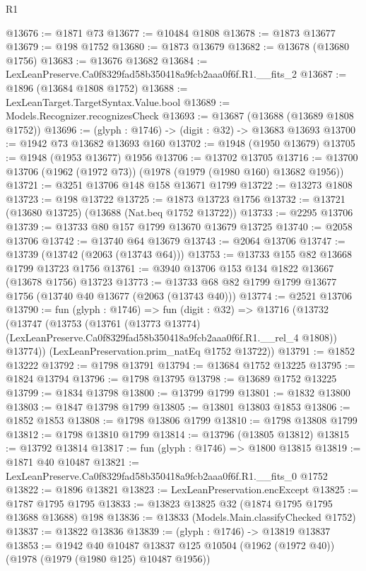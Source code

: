 \begin{lexlean}{R1}
\begin{coremodule}
@13676 := @1871 @73
@13677 := @10484 @1808
@13678 := @1873 @13677
@13679 := @198 @1752
@13680 := @1873 @13679
@13682 := @13678 (@13680 @1756)
@13683 := @13676 @13682
@13684 := LexLeanPreserve.Ca0f8329fad58b350418a9fcb2aaa0f6f.R1.__fits_2
@13687 := @1896 (@13684 @1808 @1752)
@13688 := LexLeanTarget.TargetSyntax.Value.bool
@13689 := Models.Recognizer.recognizesCheck
@13693 := @13687 (@13688 (@13689 @1808 @1752))
@13696 := (glyph : @1746) -> (digit : @32) -> @13683 @13693
@13700 := @1942 @73 @13682 @13693 @160
@13702 := @1948 (@1950 @13679)
@13705 := @1948 (@1953 @13677) @1956
@13706 := @13702 @13705
@13716 := @13700 @13706 (@1962 (@1972 @73)) (@1978 (@1979 (@1980 @160) @13682 @1956))
@13721 := @3251 @13706 @148 @158 @13671 @1799
@13722 := @13273 @1808
@13723 := @198 @13722
@13725 := @1873 @13723 @1756
@13732 := @13721 (@13680 @13725) (@13688 (Nat.beq @1752 @13722))
@13733 := @2295 @13706
@13739 := @13733 @80 @157 @1799 @13670 @13679 @13725
@13740 := @2058 @13706
@13742 := @13740 @64 @13679
@13743 := @2064 @13706
@13747 := @13739 (@13742 (@2063 (@13743 @64)))
@13753 := @13733 @155 @82 @13668 @1799 @13723 @1756
@13761 := @3940 @13706 @153 @134 @1822 @13667 (@13678 @1756) @13723
@13773 := @13733 @68 @82 @1799 @1799 @13677 @1756 (@13740 @40 @13677 (@2063 (@13743 @40)))
@13774 := @2521 @13706
@13790 := fun (glyph : @1746) =>
  fun (digit : @32) =>
  @13716
    (@13732
      (@13747
        (@13753
          (@13761
            (@13773 @13774)
            (LexLeanPreserve.Ca0f8329fad58b350418a9fcb2aaa0f6f.R1.__rel_4 @1808))
          @13774))
      (LexLeanPreservation.prim_natEq @1752 @13722))
@13791 := @1852 @13222
@13792 := @1798 @13791
@13794 := @13684 @1752 @13225
@13795 := @1824 @13794
@13796 := @1798 @13795
@13798 := @13689 @1752 @13225
@13799 := @1834 @13798
@13800 := @13799 @1799
@13801 := @1832 @13800
@13803 := @1847 @13798 @1799
@13805 := @13801 @13803 @1853
@13806 := @1852 @1853
@13808 := @1798 @13806 @1799
@13810 := @1798 @13808 @1799
@13812 := @1798 @13810 @1799
@13814 := @13796 (@13805 @13812)
@13815 := @13792 @13814
@13817 := fun (glyph : @1746) => @1800 @13815
@13819 := @1871 @40 @10487
@13821 := LexLeanPreserve.Ca0f8329fad58b350418a9fcb2aaa0f6f.R1.__fits_0 @1752
@13822 := @1896 @13821
@13823 := LexLeanPreservation.encExcept
@13825 := @1787 @1795 @1795
@13833 := @13823 @13825 @32 (@1874 @1795 @1795 @13688 @13688) @198
@13836 := @13833 (Models.Main.classifyChecked @1752)
@13837 := @13822 @13836
@13839 := (glyph : @1746) -> @13819 @13837
@13853 := @1942
    @40
    @10487
    @13837
    @125
    @10504
    (@1962 (@1972 @40))
    (@1978 (@1979 (@1980 @125) @10487 @1956))

\end{coremodule}
\end{lexlean}
